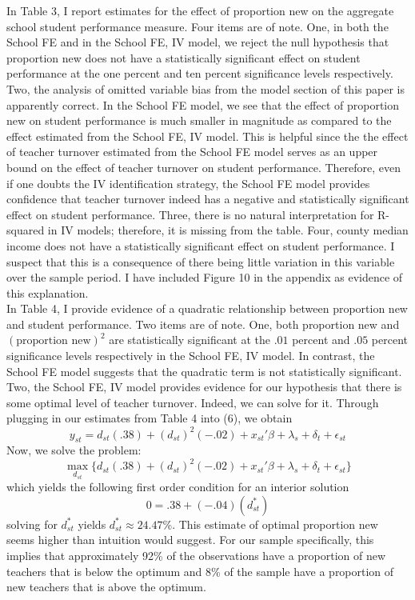 \documentclass[12pt]{report}
\begin{document}
\noindent \normalsize In Table 3, I report estimates for the effect of proportion new on the aggregate school student performance measure. Four items are of note. One, in both the School FE and in the School FE, IV model, we reject the null hypothesis that proportion new does not have a statistically significant effect on student performance at the one percent and ten percent significance levels respectively. Two, the analysis of omitted variable bias from the model section of this paper is apparently correct. In the School FE model, we see that the effect of proportion new on student performance is much smaller in magnitude as compared to the effect estimated from the School FE, IV model. This is helpful since the the effect of teacher turnover estimated from the School FE model serves as an upper bound on the effect of teacher turnover on student performance. Therefore, even if one doubts the IV identification strategy, the School FE model provides confidence that teacher turnover indeed has a negative and statistically significant effect on student performance. Three, there is no natural interpretation for R-squared in IV models; therefore, it is missing from the table. Four, county median income does not have a statistically significant effect on student performance. I suspect that this is a consequence of there being little variation in this variable over the sample period. I have included Figure 10 in the appendix as evidence of this explanation.\\
\indent In Table 4, I provide evidence of a quadratic relationship between proportion new and student performance. Two items are of note. One, both proportion new and $(\text{proportion new})^2$ are statistically significant at the $.01$ percent and $.05$ percent significance levels respectively in the School FE, IV model. In contrast, the School FE model suggests that the quadratic term is not statistically significant. Two, the  School FE, IV model provides evidence for our hypothesis that there is some optimal level of teacher turnover. Indeed, we can solve for it. Through plugging in our estimates from Table 4 into (6), we obtain 
\begin{equation}
y_{st} = d_{st}(.38) + (d_{st})^2(-.02) + x_{st}'\beta + \lambda_s + \delta_t + \epsilon_{st}
\end{equation}
\noindent Now, we solve the problem:
\begin{equation}
\max_{d_{st}}\{d_{st}(.38) + (d_{st})^2(-.02) + x_{st}'\beta + \lambda_s + \delta_t + \epsilon_{st}\}
\end{equation}
\noindent which yields the following first order condition for an interior solution 
\begin{equation}
0 = .38 + (-.04)(d_{st}^*) 
\end{equation}
\noindent solving for $d_{st}^*$ yields $d_{st}^*\approx 24.47$\%. This estimate of optimal proportion new seems higher than intuition would suggest. For our sample specifically, this implies that approximately 92\% of the observations have a proportion of new teachers that is below the optimum and 8\% of the sample have a proportion of new teachers that is above the optimum.
\end{document}
